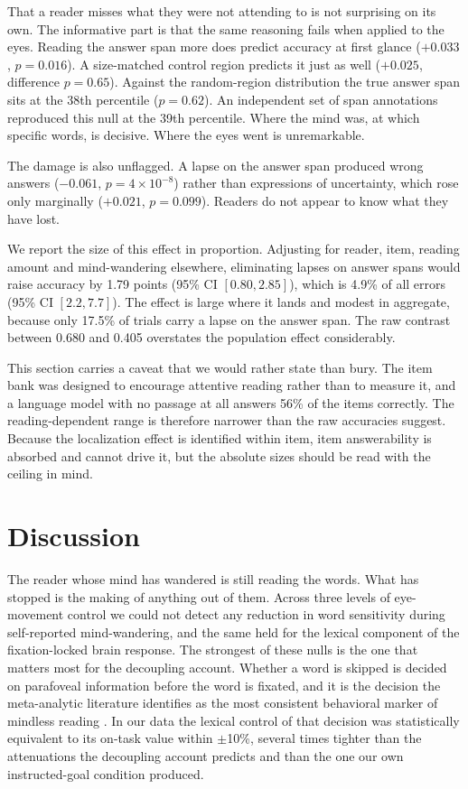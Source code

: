 \documentclass[11pt]{article}
\begin{document}
That a reader misses what they were not attending to is not surprising on its own. The
informative part is that the same reasoning fails when applied to the eyes. Reading the answer
span more does predict accuracy at first glance ($+0.033$, $p=0.016$). A size-matched control
region predicts it just as well ($+0.025$, difference $p=0.65$). Against the random-region
distribution the true answer span sits at the 38th percentile ($p=0.62$). An
independent set of span annotations reproduced this null at the 39th percentile. Where the mind
was, at which specific words, is decisive. Where the eyes went is unremarkable.

The damage is also unflagged. A lapse on the answer span produced wrong answers ($-0.061$,
$p=4\times10^{-8}$) rather than expressions of uncertainty, which rose only marginally
($+0.021$, $p=0.099$). Readers do not appear to know what they have lost.

We report the size of this effect in proportion. Adjusting for reader, item, reading amount and
mind-wandering elsewhere, eliminating lapses on answer spans would raise accuracy by 1.79 points
(95\% CI $[0.80, 2.85]$), which is 4.9\% of all errors (95\% CI $[2.2, 7.7]$). The effect is
large where it lands and modest in aggregate, because only 17.5\% of trials carry a lapse on the
answer span. The raw contrast between 0.680 and 0.405 overstates the population effect
considerably.

This section carries a caveat that we would rather state than bury. The item bank was designed
to encourage attentive reading rather than to measure it, and a language model with no passage
at all answers 56\% of the items correctly. The reading-dependent range is therefore narrower
than the raw accuracies suggest. Because the localization effect is identified within item, item
answerability is absorbed and cannot drive it, but the absolute sizes should be read with the
ceiling in mind.

\section{Discussion}

The reader whose mind has wandered is still reading the words. What has stopped is the making of
anything out of them.
Across three levels of eye-movement control we could not detect any reduction in word
sensitivity during self-reported mind-wandering, and the same held for the lexical component of
the fixation-locked brain response. The
strongest of these nulls is the one that matters most for the decoupling account. Whether a
word is skipped is decided on parafoveal information before the word is fixated, and it is the
decision the meta-analytic literature identifies as the most consistent behavioral marker of
mindless reading \citep{meziere2025}. In our data the lexical control of that decision was
statistically equivalent to its on-task value within $\pm$10\%, several times tighter than the
attenuations the decoupling account predicts and than the one our own instructed-goal condition
produced.
\end{document}
